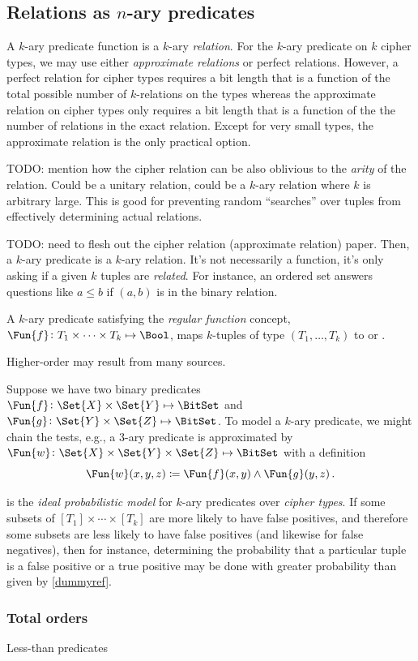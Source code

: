 \documentclass[ ../main.tex]{subfiles}
\begin{document}
\subsection{Relations as $n$-ary predicates}

A $k$-ary predicate function is a $k$-ary \emph{relation}. For the $k$-ary predicate on $k$ cipher types, we may use either \emph{approximate relations} or perfect relations. However, a perfect relation for cipher types requires a bit length that is a function of the total possible number of $k$-relations on the types whereas the approximate relation on cipher types only requires a bit length that is a function of the the number of relations in the exact relation.
Except for very small types, the approximate relation is the only practical option.

TODO: mention how the cipher relation can be also oblivious to the \emph{arity} of the relation.
Could be a unitary relation, could be a $k$-ary relation where $k$ is arbitrary large. This is good for preventing random ``searches'' over tuples from effectively determining actual relations.

TODO: need to flesh out the cipher relation (approximate relation) paper.
Then, a $k$-ary predicate is a $k$-ary relation. It's not necessarily a function, it's only asking if a given $k$ tuples are \emph{related}. For instance, an ordered set answers questions like $a \leq b$ if $(a,b)$ is in the binary relation.

A $k$-ary predicate satisfying the \emph{regular function} concept, $\Fun{f} \colon T_1 \times \cdots \times T_k \mapsto \Bool$, maps $k$-tuples of type $(T_1,\ldots,T_k)$ to \True or \False.




Higher-order may result from many sources.

Suppose we have two binary predicates $\Fun{f} \colon \Set{X} \times \Set{Y} \mapsto \BitSet$ and $\Fun{g} \colon \Set{Y} \times \Set{Z} \mapsto \BitSet$.
To model a $k$-ary predicate, we might chain the tests, e.g., a $3$-ary predicate is approximated by $\Fun{w} \colon \Set{X} \times \Set{Y} \times \Set{Z} \mapsto \BitSet$ with a definition
\begin{equation}
	\Fun{w}(x,y,z) \coloneqq \Fun{f}(x,y) \land \Fun{g}(y,z)\,.
\end{equation}


 is the \emph{ideal probabilistic model} for $k$-ary predicates over \emph{cipher types}.
If some subsets of $[T_1] \times \cdots \times [T_k]$ are more likely to have false positives, and therefore some subsets are less likely to have false positives (and likewise for false negatives), then for instance, determining the probability that a particular tuple is a false positive or a true positive may be done with greater probability than given by \cref{dummyref}.

\subsubsection{Total orders}
Less-than predicates
\end{document}

